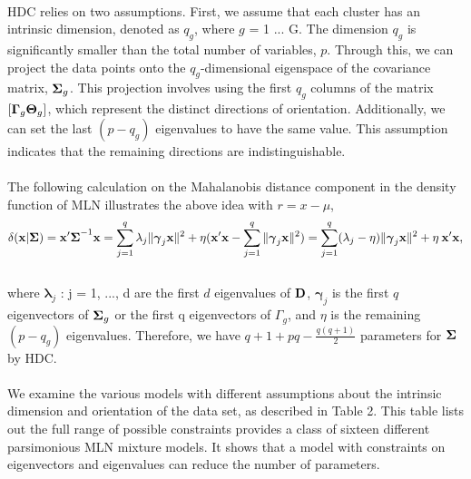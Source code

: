 \documentclass[11pt]{article}
\begin{document}
\\
HDC relies on two assumptions. First, we assume that each cluster has an intrinsic dimension, denoted as $q_g$, where $g$ = 1 ... G. The dimension $q_g$ is significantly smaller than the total number of variables, $p$. Through this, we can project the data points onto the $q_g$-dimensional eigenspace of the covariance matrix, $\bold{\Sigma}_g$. This projection involves using the first $q_g$ columns of the matrix $[\bold{\Gamma}_g\bold{\Theta}_g]$, which represent the distinct directions of orientation. Additionally, we can set the last $(p - q_g)$ eigenvalues to have the same value. This assumption indicates that the remaining directions are indistinguishable.\\
\\
The following calculation on the Mahalanobis distance component in the density function of MLN illustrates the above idea with $r = x-\mu$,
\\
$$\delta(\bold{x}|\bold{\Sigma}) = \bold{x'\Sigma}^{-1} \bold{x} 
= \sum_{j=1}^q \lambda_j \|\boldsymbol{\gamma}_j\bold{x}\|^2+\eta(\bold{x'x} - \sum_{j=1}^q\|\boldsymbol{\gamma}_j\bold{x}\|^2)
= \sum_{j=1}^q(\lambda_j-\eta)\|\boldsymbol{\gamma}_j \bold{x}\|^2 + \eta\:\bold{x'x},$$
\\
where $\boldsymbol{\lambda}_j$ : j = 1, ..., d are the first $d$ eigenvalues of $\bold{D}$, $\boldsymbol{\gamma}_j$ is the first $q$ eigenvectors of $\bold{\Sigma}_g$ or the first q eigenvectors of $\Gamma_g$, and $\eta$ is the remaining $(p-q_g)$ eigenvalues. Therefore, we have $q+1+pq-\frac{q(q+1)}{2}$ parameters for $\bold{\Sigma}$ by HDC.\\
\\
We examine the various models with different assumptions about the intrinsic dimension and orientation of the data set, as described in Table 2. This table lists out the full range of possible constraints provides a class of sixteen different parsimonious MLN mixture models. It shows that a model with constraints on eigenvectors and eigenvalues can reduce the number of parameters.
\end{document}
